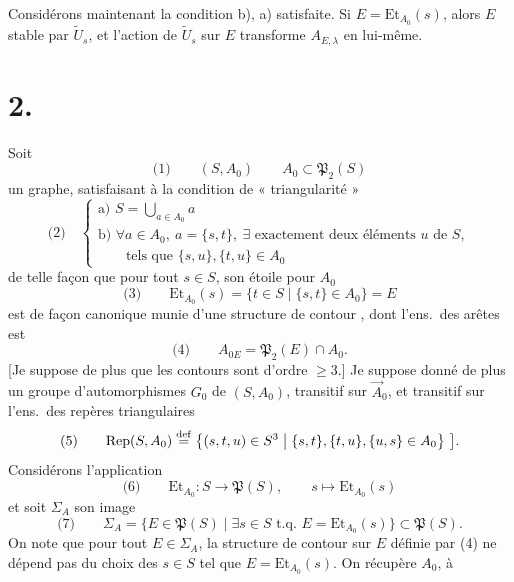 \documentclass[11pt,a4paper]{article}
\begin{document}
Considérons maintenant la condition b),  a) satisfaite.
Si $E = \mathrm{Et}_{A_0}(s)$, alors $E$  stable par
$\widetilde{U}_s$, et l'action de $\widetilde{U}_s$ sur $E$ transforme
$A_{E,\lambda}$ en lui-même.

\section{2.}

Soit 
\[
\text{(1)} \qquad (S, A_0) \qquad A_0 \subset \mathfrak{P}_2(S)
\]
un graphe, satisfaisant à la condition de « triangularité »
\[
\text{(2)}\quad
\begin{cases}
\text{a) } S = \bigcup_{a \in A_0} a \\
\text{b) } \forall a \in A_0 ,\ a = \{s,t\} ,\ \exists \text{ exactement deux éléments } u \text{ de } S,\\
\qquad \text{tels que } \{s,u\} , \{t,u\} \in A_0
\end{cases}
\]
de telle façon que pour tout $s \in S$, son étoile pour $A_0$
\[
\text{(3)} \qquad \mathrm{Et}_{A_0}(s) = \{ t \in S \mid \{s,t\} \in A_0 \} = E
\]
est de façon canonique munie d'une structure de contour \struck{\ill{}}
, dont l'ens.\ des arêtes est
\[
\text{(4)} \qquad A_{0E} = \mathfrak{P}_2(E) \cap A_0 .
\]
[Je suppose de plus que les contours sont d'ordre $\geq 3$.] Je suppose donné de
plus un groupe d'automorphismes $G_0$ de $(S, A_0)$, transitif  sur
$\vec{A}_0$, et   transitif sur l'ens.\ des repères
triangulaires
\[
\text{(5)} \qquad \mathrm{Rep}(S, A_0) \overset{\mathrm{def}}{=}
\bigl\{ (s,t,u) \in S^3 \bigm| \{s,t\} , \{t,u\} , \{u,s\} \in A_0 \bigr\} \ \bigr] .
\]
 Considérons l'application
\[
\text{(6)} \qquad \mathrm{Et}_{A_0} : S \longrightarrow \mathfrak{P}(S) , \qquad
s \longmapsto \mathrm{Et}_{A_0}(s)
\]
et soit $\Sigma_A$ son image
\[
\text{(7)} \qquad \Sigma_A = \{ E \in \mathfrak{P}(S) \mid \exists s \in S \text{ t.q. } E = \mathrm{Et}_{A_0}(s) \}
\subset \mathfrak{P}(S) .
\]
On note que pour tout $E \in \Sigma_A$, la structure de contour sur $E$ définie
par (4) ne dépend pas du choix des $s \in S$ tel que $E = \mathrm{Et}_{A_0}(s)$.
On récupère $A_0$, à
\end{document}
